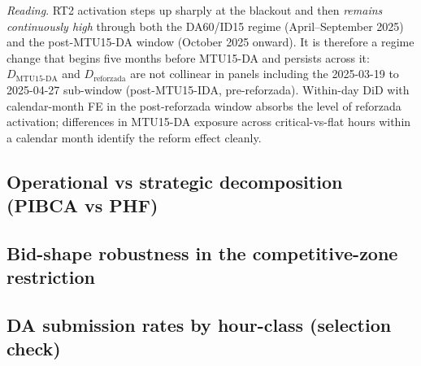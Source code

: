 \documentclass[11pt,a4paper]{article}
\begin{document}
\textit{Reading}. RT2 activation steps up sharply at the blackout and then \emph{remains continuously high} through both the DA60/ID15 regime (April--September 2025) and the post-MTU15-DA window (October 2025 onward). It is therefore a regime change that begins five months before MTU15-DA and persists across it: $D_{\text{MTU15-DA}}$ and $D_{\text{reforzada}}$ are not collinear in panels including the 2025-03-19 to 2025-04-27 sub-window (post-MTU15-IDA, pre-reforzada). Within-day DiD with calendar-month FE in the post-reforzada window absorbs the level of reforzada activation; differences in MTU15-DA exposure across critical-vs-flat hours within a calendar month identify the reform effect cleanly.

% 
%

\subsection{Operational vs strategic decomposition (PIBCA vs PHF)}\label{app:operational}

\subsection{Bid-shape robustness in the competitive-zone restriction}\label{app:competitive_zone}

\subsection{DA submission rates by hour-class (selection check)}\label{app:offer_rate}


\begin{table}[H]
\centering
\caption{\textbf{Mean per-unit CCGT DA submission rate, by firm and hour-class, October--December 2025.}}
\label{tab:per_firm_offer_rate}

\end{table}
\end{document}
